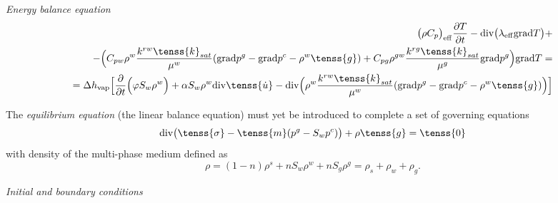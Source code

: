 { \it Energy balance equation}
 \begin{eqnarray}\label{heat}
\big( \rho C_p \big)_{\rm eff} \frac{\partial T}{\partial t} - {\rm div}\big(\lambda_{\rm eff}{\rm grad}T\big) + \nonumber\\
- \Big(C_{pw} \rho^w \frac{k^{rw}\tenss{k}_{sat}}{{\mu}^{w}} ({\rm grad}p^g - {\rm grad}p^c - \rho^w\tenss{g}) + 
C_{pg} \rho^{gw}  \frac{k^{rg}\tenss{k}_{sat}}{{\mu}^{g}} {\rm grad}p^g\Big) {\rm grad}T = \nonumber\\
=\Delta h_{\rm vap} \Big[\frac{\partial}{\partial t}\Big(\varphi S_w\rho^{w}\Big) + \alpha S_w \rho^{w} {\rm div} \tenss{\dot{u}} -
{\rm div} \Big( \rho^{w}\frac{k^{rw}\tenss{k}_{sat}}{{\mu}^{w}} ({\rm grad}p^g - {\rm grad}p^c - \rho^w\tenss{g})\Big)\Big]
\end{eqnarray}

The { \it equilibrium equation} (the linear balance equation) must yet be introduced to complete a set of governing 
equations
\begin{equation}\label{d19}
{\rm div} \big(\tenss{\sigma} - \tenss{m}(p^g - S_w p^c)\big)+ \rho \tenss{g} = \tenss{\rm 0}
\end{equation}
with density of the multi-phase medium defined as
\begin{equation}\label{d20}
\rho = (1-n)\rho^s + nS_w\rho^w + nS_g\rho^g = \rho_s + \rho_w + \rho_g.
\end{equation}

{ \it Initial and boundary conditions}

